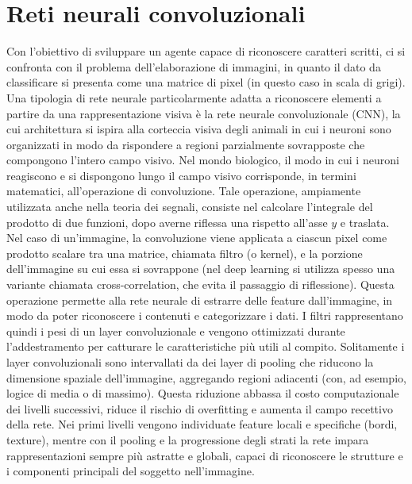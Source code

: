 \documentclass[a4paper,12pt]{article}
\begin{document}
\section{Reti neurali convoluzionali}
Con l'obiettivo di sviluppare un agente capace di riconoscere caratteri scritti, ci si confronta con il problema dell'elaborazione di immagini, in quanto il dato da classificare si presenta come una matrice di pixel (in questo caso in scala di grigi).
Una tipologia di rete neurale particolarmente adatta a riconoscere elementi a partire da una rappresentazione visiva è la rete neurale convoluzionale (CNN), la cui architettura si ispira alla corteccia visiva degli animali in cui i neuroni sono organizzati in modo da rispondere a regioni parzialmente sovrapposte che compongono l'intero campo visivo.
Nel mondo biologico, il modo in cui i neuroni reagiscono e si dispongono lungo il campo visivo corrisponde, in termini matematici, all'operazione di convoluzione.
Tale operazione, ampiamente utilizzata anche nella teoria dei segnali, consiste nel calcolare l'integrale del prodotto di due funzioni, dopo averne riflessa una rispetto all'asse $y$ e traslata.
Nel caso di un'immagine, la convoluzione viene applicata a ciascun pixel come prodotto scalare tra una matrice, chiamata filtro (o kernel), e la porzione dell'immagine su cui essa si sovrappone (nel deep learning si utilizza spesso una variante chiamata cross-correlation, che evita il passaggio di riflessione).
Questa operazione permette alla rete neurale di estrarre delle feature dall'immagine, in modo da poter riconoscere i contenuti e categorizzare i dati.
I filtri rappresentano quindi i pesi di un layer convoluzionale e vengono ottimizzati durante l'addestramento per catturare le caratteristiche più utili al compito.
Solitamente i layer convoluzionali sono intervallati da dei layer di pooling che riducono la dimensione spaziale dell'immagine, aggregando regioni adiacenti (con, ad esempio, logice di media o di massimo). Questa riduzione abbassa il costo computazionale dei livelli successivi, riduce il rischio di overfitting e aumenta il campo recettivo della rete.
Nei primi livelli vengono individuate feature locali e specifiche (bordi, texture), mentre con il pooling e la progressione degli strati la rete impara rappresentazioni sempre più astratte e globali, capaci di riconoscere le strutture e i componenti principali del soggetto nell'immagine.
\end{document}
